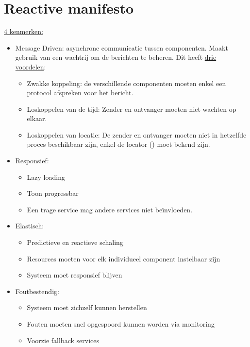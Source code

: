 \documentclass{report}
\begin{document}
	\section{Reactive manifesto}
	\underline{4 kenmerken:}
	\begin{itemize}
		\item[\info] Message Driven: asynchrone communicatie tussen componenten. Maakt gebruik van een wachtrij om de berichten te beheren. Dit heeft \underline{drie voordelen}:
		\begin{itemize}
			\item[\good] Zwakke koppeling: de verschillende componenten moeten enkel een protocol afspreken voor het bericht. 
			\item[\good] Loskoppelen van de tijd: Zender en ontvanger moeten niet wachten op elkaar.
			\item[\good] Loskoppelen van locatie: De zender en ontvanger moeten niet in hetzelfde proces beschikbaar zijn, enkel de locator () moet bekend zijn.
		\end{itemize}
		\item[\info] Responsief:
			\begin{itemize}
				\item[\info] Lazy loading
				\item[\info] Toon progressbar
				\item[\info] Een trage service mag andere services niet beïnvloeden.
			\end{itemize}
		\item[\info] Elastisch:
			\begin{itemize}
				\item[\info] Predictieve en reactieve schaling
				\item[\info] Resources moeten voor elk individueel component instelbaar zijn
				\item[\info] Systeem moet responsief blijven
			\end{itemize}
		\item[\info] Foutbestendig:
			\begin{itemize}
				\item[\info] Systeem moet zichzelf kunnen herstellen
				\item[\info] Fouten moeten snel opgespoord kunnen worden via monitoring
				\item[\info] Voorzie fallback services
			\end{itemize}
	\end{itemize}
\end{document}
